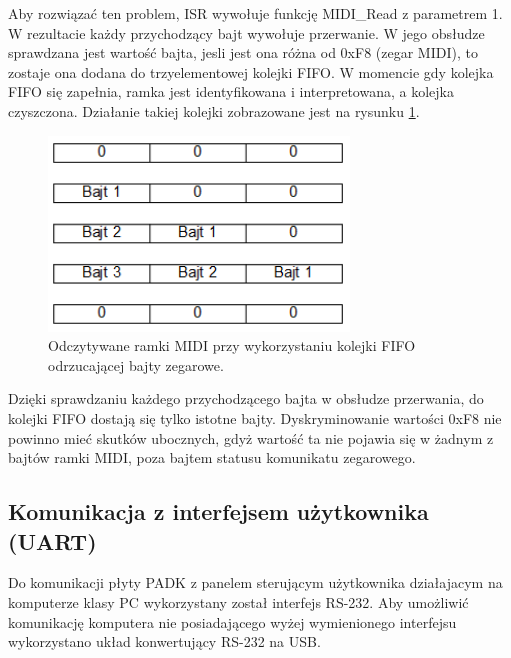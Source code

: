 Aby rozwiązać ten problem, ISR wywołuje funkcję MIDI\_Read z parametrem 1. W rezultacie każdy przychodzący bajt wywołuje przerwanie. W jego obsłudze sprawdzana jest wartość bajta, jesli jest ona różna od 0xF8 (zegar MIDI), to zostaje ona dodana do trzyelementowej kolejki FIFO. W momencie gdy kolejka FIFO się zapełnia, ramka jest identyfikowana i interpretowana, a kolejka czyszczona. Działanie takiej kolejki zobrazowane jest na rysunku \ref{rys:real_fifo}.
\begin{figure}[H]
	\centering
	\includegraphics[width=8cm]{./grafiki/real_fifo}
	\captionsetup{justification=centering}
	\caption{Odczytywane ramki MIDI przy wykorzystaniu kolejki FIFO odrzucającej bajty zegarowe.}
	\label{rys:real_fifo}
\end{figure} 
Dzięki sprawdzaniu każdego przychodzącego bajta w obsłudze przerwania, do kolejki FIFO dostają się tylko istotne bajty. Dyskryminowanie wartości 0xF8 nie powinno mieć skutków ubocznych, gdyż wartość ta nie pojawia się w żadnym z bajtów ramki MIDI, poza bajtem statusu komunikatu zegarowego.

\subsection{Komunikacja z interfejsem użytkownika (UART)}
Do komunikacji płyty PADK z panelem sterującym użytkownika działajacym na komputerze klasy PC wykorzystany został interfejs RS-232. Aby umożliwić komunikację komputera nie posiadającego wyżej wymienionego interfejsu wykorzystano układ konwertujący RS-232 na USB.

